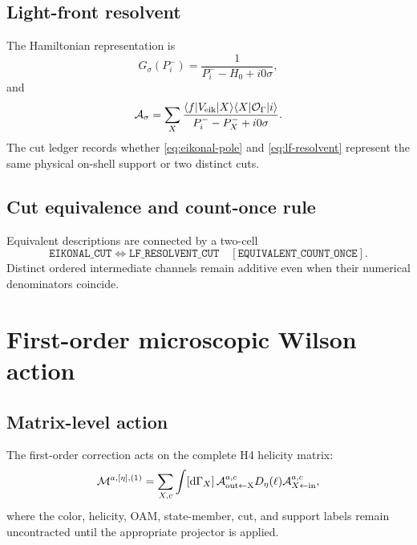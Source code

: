 \documentclass[11pt]{article}
\newcommand{\dd}{\mathrm{d}}
\newcommand{\cO}{\mathcal O}
\newcommand{\cM}{\mathcal M}
\newcommand{\cA}{\mathcal A}
\begin{document}
\subsection{Light-front resolvent}

The Hamiltonian representation is
\begin{equation}
 G_\sigma(P_i^-)
 =\frac{1}{P_i^- -H_0+i0\sigma},
 \label{eq:lf-resolvent}
\end{equation}
and
\begin{equation}
 \cA_\sigma
 =\sum_X
 \frac{
 \langle f|V_{\rm eik}|X\rangle
 \langle X|\cO_\Gamma|i\rangle
 }{P_i^- -P_X^-+i0\sigma}.
 \label{eq:lf-amplitude}
\end{equation}
The cut ledger records whether \cref{eq:eikonal-pole} and
\cref{eq:lf-resolvent} represent the same physical on-shell support or two
distinct cuts.

\subsection{Cut equivalence and count-once rule}

Equivalent descriptions are connected by a two-cell
\begin{equation}
 \texttt{EIKONAL\_CUT}
 \Longleftrightarrow
 \texttt{LF\_RESOLVENT\_CUT}
 \quad[\texttt{EQUIVALENT\_COUNT\_ONCE}].
 \label{eq:count-once}
\end{equation}
Distinct ordered intermediate channels remain additive even when their
numerical denominators coincide.

\section{First-order microscopic Wilson action}
\label{sec:first-order}

\subsection{Matrix-level action}

The first-order correction acts on the complete H4 helicity matrix:
\begin{equation}
 \cM^{a,[\eta],(1)}
 =
 \sum_{X,c}
 \int[\dd\Gamma_X]\,
 \cA^{a,c}_{\rm out\leftarrow X}
 D_\eta(\ell)
 \cA^{a,c}_{X\leftarrow\rm in},
 \label{eq:first-order-matrix}
\end{equation}
where the color, helicity, OAM, state-member, cut, and support labels remain
uncontracted until the appropriate projector is applied.
\end{document}
